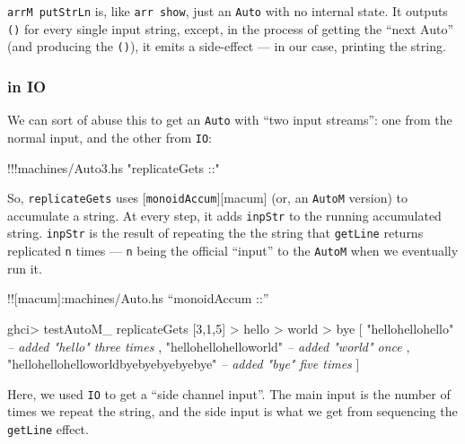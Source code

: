 \documentclass[]{article}
\newenvironment{Shaded}{}{}
\newcommand{\DecValTok}[1]{\textcolor[rgb]{0.25,0.63,0.44}{{#1}}}
\newcommand{\StringTok}[1]{\textcolor[rgb]{0.25,0.44,0.63}{{#1}}}
\newcommand{\CommentTok}[1]{\textcolor[rgb]{0.38,0.63,0.69}{\textit{{#1}}}}
\newcommand{\FunctionTok}[1]{\textcolor[rgb]{0.02,0.16,0.49}{{#1}}}
\newcommand{\NormalTok}[1]{{#1}}
\begin{document}
\texttt{arrM\ putStrLn} is, like \texttt{arr\ show}, just an
\texttt{Auto} with no internal state. It outputs \texttt{()} for every
single input string, except, in the process of getting the ``next Auto''
(and producing the \texttt{()}), it emits a side-effect --- in our case,
printing the string.

\subsubsection{in IO}\label{in-io}

We can sort of abuse this to get an \texttt{Auto} with ``two input
streams'': one from the normal input, and the other from \texttt{IO}:

\begin{Shaded}
\begin{Highlighting}[]
\FunctionTok{!!!}\NormalTok{machines}\FunctionTok{/}\NormalTok{Auto3.hs }\StringTok{"replicateGets ::"}
\end{Highlighting}
\end{Shaded}

So, \texttt{replicateGets} uses {[}\texttt{monoidAccum}{]}{[}macum{]}
(or, an \texttt{AutoM} version) to accumulate a string. At every step,
it adds \texttt{inpStr} to the running accumulated string.
\texttt{inpStr} is the result of repeating the the string that
\texttt{getLine} returns replicated \texttt{n} times --- \texttt{n}
being the official ``input'' to the \texttt{AutoM} when we eventually
run it.

!!{[}macum{]}:machines/Auto.hs ``monoidAccum ::''

\begin{Shaded}
\begin{Highlighting}[]
\NormalTok{ghci}\FunctionTok{>} \NormalTok{testAutoM_ replicateGets [}\DecValTok{3}\NormalTok{,}\DecValTok{1}\NormalTok{,}\DecValTok{5}\NormalTok{]}
\FunctionTok{>} \NormalTok{hello}
\FunctionTok{>} \NormalTok{world}
\FunctionTok{>} \NormalTok{bye}
\NormalTok{[ }\StringTok{"hellohellohello"}         \CommentTok{-- added "hello" three times}
\NormalTok{, }\StringTok{"hellohellohelloworld"}    \CommentTok{-- added "world" once}
\NormalTok{, }\StringTok{"hellohellohelloworldbyebyebyebyebye"}     \CommentTok{-- added "bye" five times}
\NormalTok{]}
\end{Highlighting}
\end{Shaded}

Here, we used \texttt{IO} to get a ``side channel input''. The main
input is the number of times we repeat the string, and the side input is
what we get from sequencing the \texttt{getLine} effect.
\end{document}
